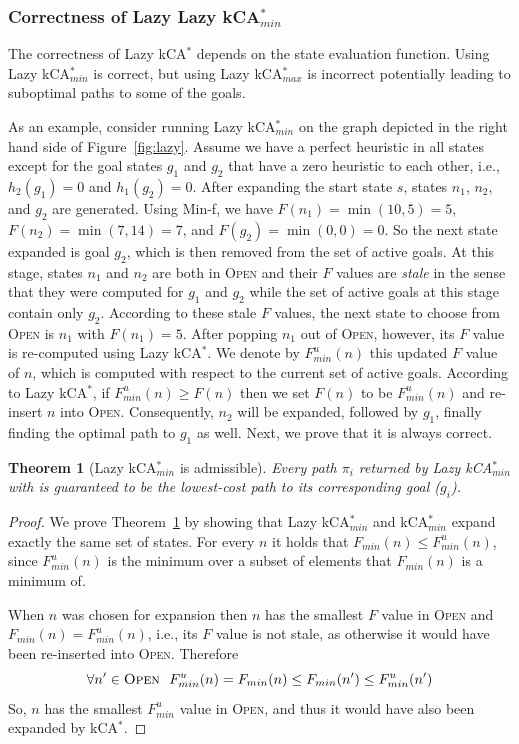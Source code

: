 \documentclass{aicom2e}
\newtheorem{theorem}{Theorem}
\newcommand{\kastar}{kCA$^*$}
\newcommand{\kastarmin}{kCA$^*_{min}$}
\newcommand{\kastarmax}{kCA$^*_{max}$}
\newcommand{\minf}{Min-f}
\newcommand{\open}{\textsc{Open}}
\begin{document}
\subsubsection*{Correctness of Lazy Lazy \kastarmin{}}

The correctness of Lazy \kastar{} depends on the state evaluation function.
Using Lazy \kastarmin{} is correct, but using Lazy \kastarmax{} is incorrect
potentially leading to suboptimal paths to some of the goals.



As an example, consider running Lazy \kastarmin{} on the graph depicted in the
right hand side of Figure~\ref{fig:lazy}. Assume we have a perfect heuristic in
all states except for the goal states $g_1$ and $g_2$ that have a zero
heuristic to each other, i.e., $h_2(g_1)=0$ and $h_1(g_2)=0$. After expanding
the start state $s$, states $n_1$, $n_2$, and $g_2$ are generated. Using
\minf{}, we have $F(n_1)=\min(10,5)=5$, $F(n_2)=\min(7,14)=7$, and
$F(g_2)=\min(0,0)=0$. So the next state expanded is goal $g_2$, which is then
removed from the set of active goals. At this stage, states $n_1$ and $n_2$ are
both in \open{} and their $F$ values are {\em stale} in the sense that they
were computed for $g_1$ and $g_2$ while the set of active goals at this stage
contain only $g_2$. According to these stale $F$ values, the next state to
choose from \open{} is $n_1$ with $F(n_1)=5$. After popping $n_1$ out of
\open{}, however, its $F$ value is re-computed  using Lazy \kastar{}. We denote
by $F^u_{min}(n)$ this updated $F$ value of $n$, which is computed with respect
to the current set of active goals. According to Lazy \kastar{}, if
$F^u_{min}(n)\geq F(n)$ then we set $F(n)$ to be $F^u_{min}(n)$ and re-insert
$n$ into \open{}. Consequently, $n_2$ will be expanded, followed by $g_1$,
finally finding the optimal path to $g_1$ as well. Next, we prove that it is
always correct.


\begin{theorem}[Lazy \kastarmin{} is admissible]
Every path $\pi_i$ returned by Lazy \kastarmin{} with is guaranteed to be the
lowest-cost path to its corresponding goal ($g_i$).
\label{the:lazy-minf-correct}
\end{theorem}
\begin{proof}

We prove Theorem~\ref{the:lazy-minf-correct} by showing that Lazy \kastarmin{}
and \kastarmin{}  expand exactly the same set of states. For every $n$ it holds
that $F_{min}(n)\leq F^u_{min}(n)$, since $F^u_{min}(n)$ is the minimum over a
subset of elements that $F_{min}(n)$ is a minimum of.

When $n$ was chosen for expansion then $n$ has the smallest $F$ value in
\open{} and $F_{min}(n)=F^u_{min}(n)$, i.e., its $F$ value is not stale, as
otherwise it would have been re-inserted into \open{}. Therefore
 \[ \forall n'\in\open{} ~~ F^u_{min}(n)=F_{min}(n)\leq F_{min}(n') \leq F^u_{min}(n') \]
 So, $n$ has the smallest $F^u_{min}$ value in \open{}, and thus it would have also been expanded by \kastar{}.
\end{proof}
\end{document}
